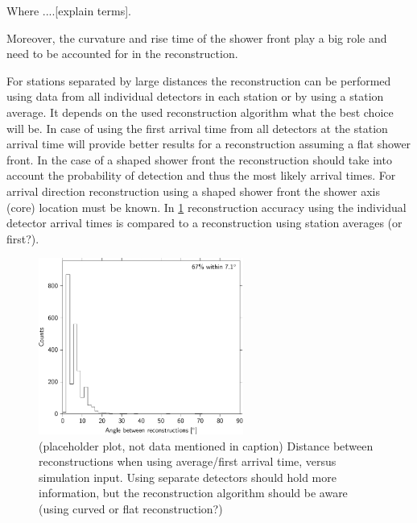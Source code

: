 Where ....[explain terms].

Moreover, the curvature and rise time of the shower front play a big role and need to be accounted for in the reconstruction.

For stations separated by large distances the reconstruction can be performed using data from all individual detectors in each station or by using a station average. It depends on the used reconstruction algorithm what the best choice will be. In case of using the first arrival time from all detectors at the station arrival time will provide better results for a reconstruction assuming a flat shower front. In the case of a shaped shower front the reconstruction should take into account the probability of detection and thus the most likely arrival times. For arrival direction reconstruction using a shaped shower front the shower axis (core) location must be known. In \cref{fig:angle_between_501_minn16_510} reconstruction accuracy using the individual detector arrival times is compared to a reconstruction using station averages (or first?).

\begin{figure}
    \centering
    \includegraphics[width=0.6\textwidth]
                    {plots/cluster/angle_between_501_minn16_510}
    \caption{(placeholder plot, not data mentioned in caption) Distance between reconstructions when using average/first arrival time, versus simulation input. Using separate detectors should hold more information, but the reconstruction algorithm should be aware (using curved or flat reconstruction?)}
    \label{fig:angle_between_501_minn16_510}
\end{figure}


